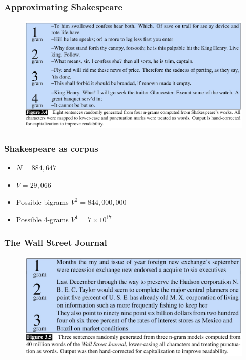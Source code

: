 \documentclass[13.5pt,aspecratio=169]{beamer}
\begin{document}
    
    \begin{frame}
        \frametitle{Approximating Shakespeare}
            \begin{figure}
                \centering
                \includegraphics [scale=0.48] {fig3.4.jpg}
                \label{fig:enter-label}
            \end{figure}
    \end{frame}
    
    
    \begin{frame}
        \frametitle{Shakespeare as corpus}
        
            \begin{block}{}
                 \begin{itemize}
                   \item $N = 884,647$
                   \item $V = 29,066$
                   \item Possible bigrams $V^2 = 844,000,000$
                   \item Possible 4-grams $V^4 = 7 \times 10^{17}$
                \end{itemize}
            \end{block}
    \end{frame}
    
    
    \begin{frame}
        \frametitle{The Wall Street Journal}
            \begin{figure}
                \centering
                \includegraphics [scale=0.57] {fig3.5.jpg}
                \label{fig:enter-label}
            \end{figure}
    \end{frame}
    
\end{document}
